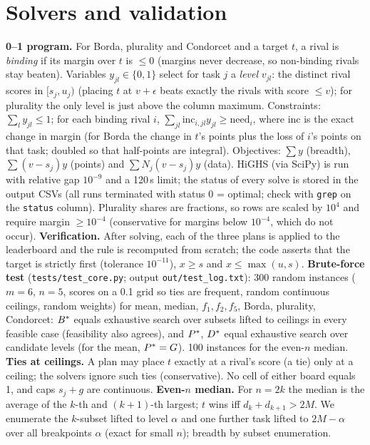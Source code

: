 \section{Solvers and validation}\label{app:val}
\textbf{0--1 program.} For Borda, plurality and Condorcet and a target $t$, a rival is \emph{binding} if its margin over $t$ is $\le0$ (margins never decrease, so non-binding rivals stay beaten). Variables $y_{jl}\in\{0,1\}$ select for task $j$ a \emph{level} $v_{jl}$: the distinct rival scores in $[s_j,u_j)$ (placing $t$ at $v+\epsilon$ beats exactly the rivals with score $\le v$); for plurality the only level is just above the column maximum. Constraints: $\sum_ly_{jl}\le1$; for each binding rival $i$, $\sum_{jl}\mathrm{inc}_{i,jl}y_{jl}\ge\mathrm{need}_i$, where $\mathrm{inc}$ is the exact change in margin (for Borda the change in $t$'s points plus the loss of $i$'s points on that task; doubled so that half-points are integral). Objectives: $\sum y$ (breadth), $\sum(v-s_j)y$ (points) and $\sum N_j(v-s_j)y$ (data). HiGHS (via SciPy) is run with relative gap $10^{-9}$ and a 120\,s limit; the status of every solve is stored in the output CSVs (all runs terminated with status 0 = optimal; check with \texttt{grep} on the \texttt{status} column). Plurality shares are fractions, so rows are scaled by $10^4$ and require margin $\ge10^{-4}$ (conservative for margins below $10^{-4}$, which do not occur).
\textbf{Verification.} After solving, each of the three plans is applied to the leaderboard and the rule is recomputed from scratch; the code asserts that the target is strictly first (tolerance $10^{-11}$), $x\ge s$ and $x\le\max(u,s)$.
\textbf{Brute-force test} (\texttt{tests/test\_core.py}; output \texttt{out/test\_log.txt}): 300 random instances ($m{=}6$, $n{=}5$, scores on a 0.1 grid so ties are frequent, random continuous ceilings, random weights) for mean, median, $f_1,f_2,f_5$, Borda, plurality, Condorcet: $B^{\ast}$ equals exhaustive search over subsets lifted to ceilings in every feasible case (feasibility also agrees), and $P^{\ast}$, $D^{\ast}$ equal exhaustive search over candidate levels (for the mean, $P^{\ast}=G$). 100 instances for the even-$n$ median.
\textbf{Ties at ceilings.} A plan may place $t$ exactly at a rival's score (a tie) only at a ceiling; the solvers ignore such ties (conservative). No cell of either board equals 1, and caps $s_j+g$ are continuous.
\textbf{Even-$n$ median.} For $n=2k$ the median is the average of the $k$-th and $(k{+}1)$-th largest; $t$ wins iff $d_k+d_{k+1}>2M$. We enumerate the $k$-subset lifted to level $\alpha$ and one further task lifted to $2M-\alpha$ over all breakpoints $\alpha$ (exact for small $n$); breadth by subset enumeration.

